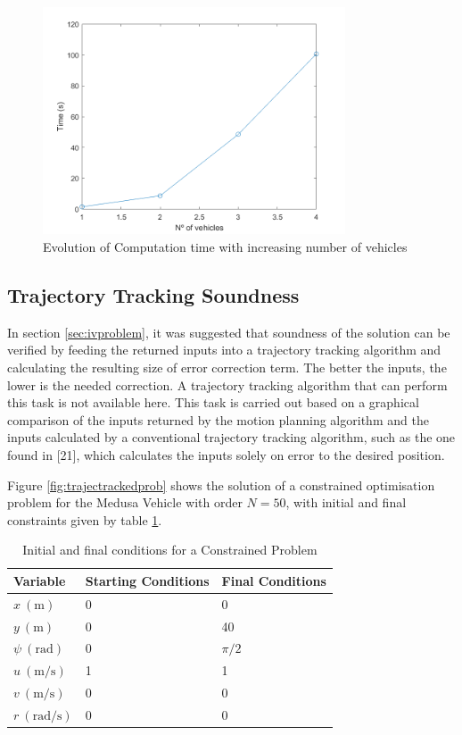 \begin{figure}[h!]
\centering
\includegraphics[width=0.8\textwidth]{Images/results/timeevolutionmultiplevehicles.png}
\caption{Evolution of Computation time with increasing number of vehicles}
\label{fig:timeevolutionmultiplevehicles}
\end{figure}


\subsection{Trajectory Tracking Soundness}

\par In section \ref{sec:ivproblem}, it was suggested that soundness of the solution can be verified by feeding the returned inputs into a trajectory tracking algorithm and calculating the resulting size of error correction term. The better the inputs, the lower is the needed correction. A trajectory tracking algorithm that can perform this task is not available here. This task is carried out based on a graphical comparison of the inputs returned by the motion planning algorithm and the inputs calculated by a conventional trajectory tracking algorithm, such as the one found in [21], which calculates the inputs solely on error to the desired position.
\par Figure \ref{fig:trajectrackedprob} shows the solution of a constrained optimisation problem for the Medusa Vehicle with order $N=50$, with initial and final constraints given by table \ref{tab:soundnessproblem}. 

\begin{table}[h!]
\centering
\begin{tabular}{|l|l|l|}
\hline
Variable & Starting Conditions & Final Conditions \\ \hline
$x\ (\si{\meter})$ & 0 & 0 \\
$y\ (\si{\meter})$ & 0 & 40 \\
$\psi\ (\si{\radian})$ & 0 & $\pi/2$ \\
$u\ (\si{\meter\per\second})$ & 1 & 1 \\
$v\ (\si{\meter\per\second})$ & 0 & 0 \\
$r\ (\si{\radian\per\second})$ & 0 & 0 \\
\hline
\end{tabular}
\caption{Initial and final conditions for a Constrained Problem}
\label{tab:soundnessproblem}
\end{table}

